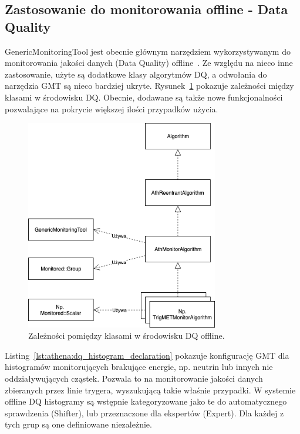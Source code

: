 \subsection{Zastosowanie do monitorowania offline - Data Quality}
GenericMonitoringTool jest obecnie głównym narzędziem wykorzystywanym do monitorowania jakości danych (Data Quality) offline~\cite{atlas-multithread-article}.
Ze względu na nieco inne zastosowanie, użyte są dodatkowe klasy algorytmów DQ, a odwołania do narzędzia GMT są nieco bardziej ukryte.
Rysunek~\ref{fig:athena:offlineDiagram} pokazuje zależności między klasami w środowisku DQ.
Obecnie, dodawane są także nowe funkcjonalności pozwalające na pokrycie większej ilości przypadków użycia.

\begin{figure}[!ht]
\centering
\includegraphics[width=0.75\textwidth]{img/offline_diagram.png}
\caption{
Zależności pomiędzy klasami w środowisku DQ offline.
}
\label{fig:athena:offlineDiagram}
\end{figure}

Listing~\ref{lst:athena:dq_histogram_declaration} pokazuje konfigurację GMT dla histogramów monitorujących brakujące energie, np. neutrin lub innych nie oddziaływujących cząstek.
Pozwala to na monitorowanie jakości danych zbieranych przez linie trygera, wyszukującą takie właśnie przypadki.
W systemie offline DQ histogramy są wstępnie kategoryzowane jako te do automatycznego sprawdzenia (Shifter), lub przeznaczone dla ekspertów (Expert).
Dla każdej z tych grup są one definiowane niezależnie. 

